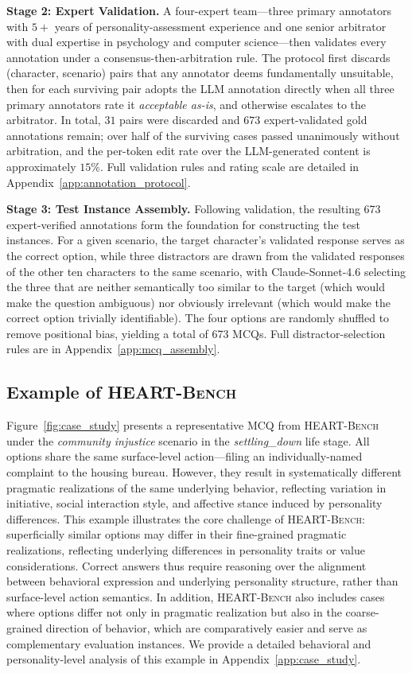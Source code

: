 \documentclass{article}
\newcommand{\ourbench}[0]{\textsc{HEART-Bench}\xspace}
\begin{document}
\textbf{Stage 2: Expert Validation.}
A four-expert team---three primary annotators with $5{+}$ years of personality-assessment experience and one senior arbitrator with dual expertise in psychology and computer science---then validates every annotation under a consensus-then-arbitration rule. The protocol first discards (character, scenario) pairs that any annotator deems fundamentally unsuitable, then for each surviving pair adopts the LLM annotation directly when all three primary annotators rate it \textit{acceptable as-is}, and otherwise escalates to the arbitrator. In total, $31$ pairs were discarded and $673$ expert-validated gold annotations remain; over half of the surviving cases passed unanimously without arbitration, and the per-token edit rate over the LLM-generated content is approximately $15\%$. Full validation rules and rating scale are detailed in Appendix~\ref{app:annotation_protocol}.

\textbf{Stage 3: Test Instance Assembly.}
Following validation, the resulting 673 expert-verified annotations form the foundation for constructing the test instances. For a given scenario, the target character's validated response serves as the correct option, while three distractors are drawn from the validated responses of the other ten characters to the same scenario, with Claude-Sonnet-4.6 selecting the three that are neither semantically too similar to the target (which would make the question ambiguous) nor obviously irrelevant (which would make the correct option trivially identifiable). The four options are randomly shuffled to remove positional bias, yielding a total of 673 MCQs. Full distractor-selection rules are in Appendix~\ref{app:mcq_assembly}.

\label{gen_inst}

\subsection{Example of \ourbench}
Figure~\ref{fig:case_study} presents a representative MCQ from \ourbench under the \emph{community injustice} scenario in the \emph{settling\_down} life stage. All options share the same surface-level action---filing an individually-named complaint to the housing bureau. However, they result in systematically different pragmatic realizations of the same underlying behavior, reflecting variation in initiative, social interaction style, and affective stance induced by personality differences. This example illustrates the core challenge of \ourbench: superficially similar options may differ in their fine-grained pragmatic realizations, reflecting underlying differences in personality traits or value considerations. Correct answers thus require reasoning over the alignment between behavioral expression and underlying personality structure, rather than surface-level action semantics. In addition, \ourbench also includes cases where options differ not only in pragmatic realization but also in the coarse-grained direction of behavior, which are comparatively easier and serve as complementary evaluation instances. We provide a detailed behavioral and personality-level analysis of this example in Appendix~\ref{app:case_study}.
\end{document}
